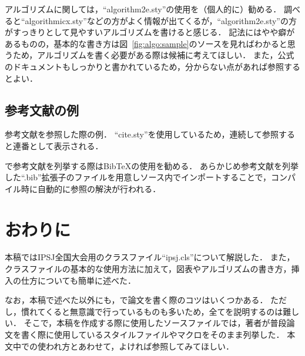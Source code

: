 \documentclass{ipsj}
\theoremstyle{definition}
\newcommand{\Fig}[1]{図~#1}
\begin{document}
アルゴリズムに関しては，``algorithm2e.sty''の使用を（個人的に）勧める．
調べると``algorithmicx.sty''などの方がよく情報が出てくるが，``algorithm2e.sty''の方がすっきりとして見やすいアルゴリズムを書けると感じる．
記法にはやや癖があるものの，基本的な書き方は\Fig{\ref{fig:algo:sample}}のソースを見ればわかると思うため，アルゴリズムを書く必要がある際は候補に考えてほしい．
また，公式のドキュメントもしっかりと書かれているため，分からない点があれば参照するとよい．



\subsection{参考文献の例}

参考文献を参照した際の例\cite{book:Aho2006,icde:Diao2002,new-gen-comp:Kowalski1989,tech:Hopcroft1971,url:grep}．
``cite.sty''を使用しているため，連続して参照すると連番として表示される．

{\LaTeXe}で参考文献を列挙する際はBibTeXの使用を勧める．
あらかじめ参考文献を列挙した``.bib''拡張子のファイルを用意し{\LaTeXe}ソース内でインポートすることで，コンパイル時に自動的に参照の解決が行われる．





\section{おわりに}

本稿ではIPSJ全国大会用のクラスファイル``ipsj.cls''について解説した．
また，クラスファイルの基本的な使用方法に加えて，図表やアルゴリズムの書き方，挿入の仕方についても簡単に述べた．

なお，本稿で述べた以外にも，{\LaTeXe}で論文を書く際のコツはいくつかある．
ただし，慣れてくると無意識で行っているものも多いため，全てを説明するのは難しい．
そこで，本稿を作成する際に使用したソースファイルでは，著者が普段論文を書く際に使用しているスタイルファイルやマクロをそのまま列挙した．
本文中での使われ方とあわせて，よければ参照してみてほしい．

\small


\end{document}
